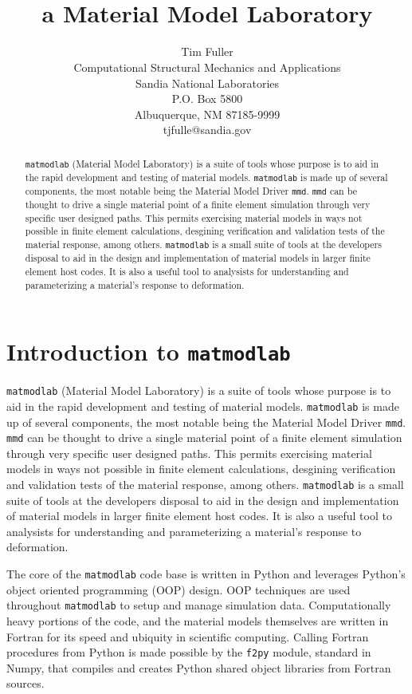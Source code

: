 \documentclass[pdf,ps2pdf,12pt,report,strict]{SANDreport/SANDreport}
\title{\mml{} \\ a Material Model Laboratory}
\author{Tim Fuller \\
  Computational Structural Mechanics and Applications \\
  Sandia National Laboratories\\
  P.O. Box 5800\\
  Albuquerque, NM 87185-9999 \\
  tjfulle@sandia.gov }
\date{}
\newcommand{\mml}{\texttt{matmodlab}}
\newcommand{\mmd}{\texttt{mmd}}
\newcommand{\fpy}[1]{\texttt{f2py}}
\begin{document}
\maketitle

\begin{abstract}
  \mml{} (Material Model Laboratory) is a suite of tools whose purpose is to aid
  in the rapid development and testing of material models. \mml{} is made up of
  several components, the most notable being the Material Model Driver \mmd{}.
  \mmd{} can be thought to drive a single material point of a finite element
  simulation through very specific user designed paths. This permits exercising
  material models in ways not possible in finite element calculations, desgining
  verification and validation tests of the material response, among others.
  \mml{} is a small suite of tools at the developers disposal to aid in the
  design and implementation of material models in larger finite element host
  codes. It is also a useful tool to analysists for understanding and
  parameterizing a material's response to deformation.
\end{abstract}

\cleardoublepage		%
\tableofcontents
\listoffigures
\listoftables

\SANDmain		%

\chapter{Introduction to \mml{}}
\label{chap:intro}
\mml{} (Material Model Laboratory) is a suite of tools whose purpose is to aid
in the rapid development and testing of material models. \mml{} is made up of
several components, the most notable being the Material Model Driver \mmd{}.
\mmd{} can be thought to drive a single material point of a finite element
simulation through very specific user designed paths. This permits exercising
material models in ways not possible in finite element calculations, desgining
verification and validation tests of the material response, among others.
\mml{} is a small suite of tools at the developers disposal to aid in the
design and implementation of material models in larger finite element host
codes. It is also a useful tool to analysists for understanding and
parameterizing a material's response to deformation.

The core of the \mml{} code base is written in Python and leverages Python's
object oriented programming (OOP) design. OOP techniques are used throughout
\mml{} to setup and manage simulation data. Computationally heavy portions of
the code, and the material models themselves are written in Fortran for its
speed and ubiquity in scientific computing. Calling Fortran procedures from
Python is made possible by the \fpy{} module, standard in Numpy, that compiles
and creates Python shared object libraries from Fortran sources.
\end{document}
